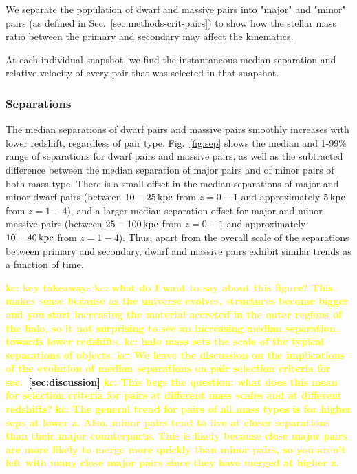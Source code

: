 \documentclass[twocolumn]{aastex631}
\newcommand{\kc}[1]{\textcolor{yellow}{\textbf{kc: #1}} }
\begin{document}
We separate the population of dwarf and massive pairs into "major" and "minor" pairs (as defined in Sec.~\ref{sec:methods-crit-pairs}) to show how the stellar mass ratio between the primary and secondary may affect the kinematics. 

At each individual snapshot, we find the instantaneous median separation and relative velocity of every pair that was selected in that snapshot. 

\subsubsection{Separations}
The median separations of dwarf pairs and massive pairs smoothly increases with lower redshift, regardless of pair type. 
Fig.~\ref{fig:sep} shows the median and 1-99\% range of separations for dwarf pairs and massive pairs, as well as the subtracted difference between the median separation of major pairs and of minor pairs of both mass type. 
There is a small offset in the median separations of major and minor dwarf pairs (between $10-25\,\mathrm{kpc}$ from  $z=0-1$ and approximately $5\,\mathrm{kpc}$ from $z=1-4$), and a larger median separation offset for major and minor massive pairs (between $25-100\,\mathrm{kpc}$ from  $z=0-1$ and approximately $10-40\,\mathrm{kpc}$ from $z=1-4$). 
Thus, apart from the overall scale of the separations between primary and secondary, dwarf and massive pairs exhibit similar trends as a function of time. 

\kc{key takeaways}
\kc{what do I want to say about this figure? This makes sense because as the universe evolves, structures become bigger and you start increasing the material accreted in the outer regions of the halo, so it not surprising to see an increasing median separation towards lower redshifts. }
\kc{halo mass sets the scale of the typical separations of objects.}
\kc{We leave the discussion on the implications of the evolution of median separations on pair selection criteria for sec.~\ref{sec:discussion}}
\kc{This begs the question: what does this mean for selection criteria for pairs at different mass scales and at different redshifts?}
\kc{The general trend for pairs of all mass types is for higher seps at lower z. Also, minor pairs tend to live at closer separations than their major counterparts. This is likely because close major pairs are more likely to merge more quickly than minor pairs, so you aren't left with many close major pairs since they have merged at higher z.}
\end{document}
